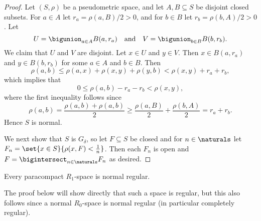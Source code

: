 \documentclass[article, a4paper, 11pt, oneside]{memoir}
\numberwithin{equation}{chapter}
\begin{document}
\begin{proof}
    Let $(S,\rho)$ be a pseudometric space, and let $A, B \subseteq S$ be disjoint closed subsets. For $a \in A$ let $r_a = \rho(a,B)/2 > 0$, and for $b \in B$ let $r_b = \rho(b,A)/2 > 0$. Let
    \begin{equation*}
        U = \bigunion_{a \in A} B(a,r_a)
        \quad \text{and} \quad
        V = \bigunion_{b \in B} B(b,r_b).
    \end{equation*}
    We claim that $U$ and $V$ are disjoint. Let $x \in U$ and $y \in V$. Then $x \in B(a,r_a)$ and $y \in B(b,r_b)$ for some $a \in A$ and $b \in B$. Then
    \begin{equation*}
        \rho(a,b)
            \leq \rho(a,x) + \rho(x,y) + \rho(y,b)
            < \rho(x,y) + r_a + r_b,
    \end{equation*}
    which implies that
    \begin{equation*}
        0
            \leq \rho(a,b) - r_a - r_b
            < \rho(x,y),
    \end{equation*}
    where the first inequality follows since
    \begin{equation*}
        \rho(a,b)
            = \frac{\rho(a,b) + \rho(a,b)}{2}
            \geq \frac{\rho(a,B)}{2} + \frac{\rho(b,A)}{2}
            = r_a + r_b.
    \end{equation*}
    Hence $S$ is normal.

    We next show that $S$ is $G_\delta$, so let $F \subseteq S$ be closed and for $n \in \naturals$ let $F_n = \set{x \in S}{\rho(x,F) < \tfrac{1}{n}}$. Then each $F_n$ is open and $F = \bigintersect_{n \in \naturals} F_n$ as desired.
\end{proof}



\begin{proposition}
    \label{prop:paracompact-R1-is-normal-regular}
    Every paracompact $R_1$-space is normal regular.
\end{proposition}
%
The proof below will show directly that such a space is regular, but this also follows since a normal $R_0$-space is normal regular (in particular completely regular).

\newcommand{\bbU}{\mathbb{U}}
\newcommand{\bbV}{\mathbb{V}}
\end{document}
